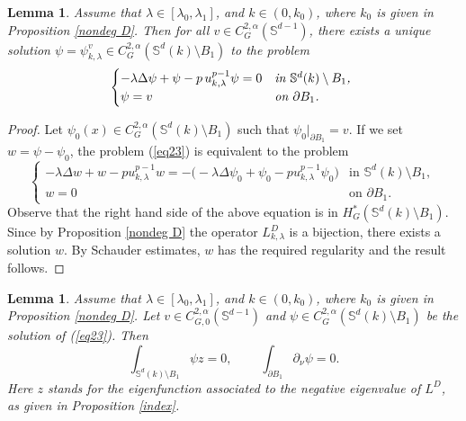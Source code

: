 \documentclass[reqno]{amsart}
\newtheorem{lemma}[theorem]{Lemma}
\numberwithin{equation}{section}
\newenvironment{key words}{\textbf{Keywords}\mbox{  }}{ }
\begin{document}
 \begin{lemma} \label{le29}
Assume that $\lambda\in[\lambda_{0},\lambda_{1}]$, and $k \in (0, k_0)$, where $k_0$ is given in Proposition \ref{nondeg D}. Then for all $v\in C_{G}^{2,\alpha}(\mathbb{S}^{d-1})$, there exists a unique solution $\psi= \psi_{k, \lambda}^v \in C^{2, \alpha}_G(\mathbb{S}^{d}(k)\setminus B_{1})$ to the problem
\begin{equation}\label{eq23}
  \begin{cases}
  -\lambda\Delta\psi +\psi -p \, u_{k,\lambda}^{p-1}\psi =0 &\emph{in $\mathbb{S}^{d}(k)\setminus B_{1}$, }\\
  \psi= v &\emph{on $\partial B_1$.}
  \end{cases}
\end{equation}
\end{lemma}
\begin{proof} Let $\psi_{0}(x) \in C_{G}^{2, \alpha}(\mathbb{S}^{d}(k)\setminus B_{1})$ such that $\psi_0|_{\partial B_1} = v$.
If we set $w=\psi-\psi_{0}$, the problem (\ref{eq23}) is equivalent to the problem
\begin{equation*}
  \begin{cases}
  -\lambda\Delta w+w-p u_{k,\lambda}^{p-1}w= - \Big ( -\lambda\Delta \psi_{0}+\psi_{0}-pu_{k,\lambda}^{p-1}\psi_{0}  \Big ) &\mbox{in $\mathbb{S}^{d}(k)\setminus B_{1}$, }\\
 w=0 &\mbox{on $\partial B_1$.}
  \end{cases}
\end{equation*}
Observe that the right hand side of the above equation is in $H^{*}_G(\mathbb{S}^{d}(k)\setminus B_{1})$. Since by Proposition \ref{nondeg D} the operator $L_{k, \lambda}^D$ is a bijection, there exists a solution $w$. By Schauder estimates, $w$ has the required regularity and the result follows.
\end{proof}
\begin{lemma} \label{Le31} Assume that $\lambda\in[\lambda_{0},\lambda_{1}]$, and $k \in (0, k_0)$, where $k_0$ is given in Proposition \ref{nondeg D}.
Let $v\in C_{G,0}^{2,\alpha}(\mathbb{S}^{d-1})$ and $\psi \in C_{G}^{2,\alpha}(\mathbb{S}^{d}(k)\setminus B_{1})$ be the solution of  (\ref{eq23}). Then
 \[\int_{\mathbb{S}^{d}(k)\setminus B_{1}}\psi z=0,~\qquad  \int_{\partial B_1}\partial_{\nu}\psi =0.\]
 Here $z$ stands for the eigenfunction associated to the negative eigenvalue of $L^D$, as given in Proposition \ref{index}.
\end{lemma}
\end{document}
